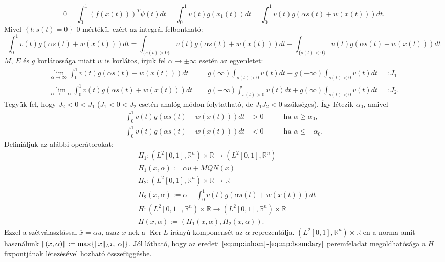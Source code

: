 \documentclass[oneside, titlepage, 12pt, a4paper]{report}
\DeclareMathOperator{\Ker}{Ker}	%
\DeclarePairedDelimiter\norm{\lVert}{\rVert}	%
\DeclarePairedDelimiter\abs{\lvert}{\rvert}	%
\begin{document}
\begin{equation*}
0 = \int_0^1 \left( f(x(t)) \right)^T \psi(t) dt = \int_0^1 v(t) g(x_1(t)) dt = \int_0^1 v(t) g(\alpha s(t) + w(x(t))) dt.
\end{equation*}
Mivel $\left\{ t : s(t) =0 \right\}$ 0-mértékű, ezért az integrál felbontható:
\begin{equation*}
\int_0^1 v(t) g(\alpha s(t) + w(x(t))) dt = \int_{\{ s(t) > 0 \}} v(t) g(\alpha s(t) + w(x(t))) dt + \int_{\{ s(t) < 0 \}} v(t) g(\alpha s(t) + w(x(t))) dt
\end{equation*}
$M$, $E$ és $g$ korlátossága miatt $w$ is korlátos, írjuk fel $\alpha \to \pm \infty$ esetén az egyenletet:
\begin{align*}
\lim_{\alpha \to \infty} \int_0^1 v(t) g(\alpha s(t) + w(x(t))) dt &= g(\infty) \int_{s(t) > 0} v(t) dt + g(-\infty) \int_{s(t) < 0} v(t) dt =: J_1 \\
\lim_{\alpha \to -\infty} \int_0^1 v(t) g(\alpha s(t) + w(x(t))) dt &= g(-\infty) \int_{s(t) > 0} v(t) dt + g(\infty) \int_{s(t) < 0} v(t) dt =: J_2.
\end{align*}
Tegyük fel, hogy $J_2 < 0 < J_1$ ($J_1 < 0 < J_2$ esetén analóg módon folytatható, de $J_1 J_2 < 0$ szükséges). Így létezik $\alpha_0$, amivel
\begin{align}
\int_0^1 v(t) g(\alpha s(t) + w(x(t))) dt &> 0 \qquad &\text{ha } \alpha \geq \alpha_0, \label{eq:mp:alpha} \\
\int_0^1 v(t) g(\alpha s(t) + w(x(t))) dt &< 0 \qquad &\text{ha } \alpha \leq -\alpha_0. \nonumber
\end{align}
Definiáljuk az alábbi operátorokat:
\begin{align*}
&H_1 : ( L^2[0, 1], \mathbb{R}^n) \times \mathbb{R} \rightarrow ( L^2[0, 1], \mathbb{R}^n) \\
&H_1(x, \alpha) := \alpha u + M Q N (x) \\
&H_2 :  ( L^2[0, 1], \mathbb{R}^n) \times \mathbb{R} \rightarrow \mathbb{R} \\
&H_2(x, \alpha) := \alpha - \int_0^1 v(t) g(\alpha s(t) + w(x(t))) dt \\
&H : ( L^2[0, 1], \mathbb{R}^n) \times \mathbb{R} \rightarrow ( L^2[0, 1], \mathbb{R}^n) \times \mathbb{R} \\
&H(x, \alpha) := (H_1 (x, \alpha), H_2(x, \alpha)).
\end{align*}
Ezzel a szétválasztással $\overline{x} = \alpha u$, azaz $x$-nek a $\Ker L$ irányú komponensét az $\alpha$ reprezentálja. $( L^2[0, 1], \mathbb{R}^n) \times \mathbb{R}$-en a norma amit használunk $\norm{(x, \alpha)} := \max \{ \norm{x}_{L^2}, \abs{\alpha} \}$. Jól látható, hogy az eredeti $\eqref{eq:mp:inhom}$-$\eqref{eq:mp:boundary}$ peremfeladat megoldhatósága a $H$ fixpontjának létezésével hozható összefüggésbe. \\
\end{document}
